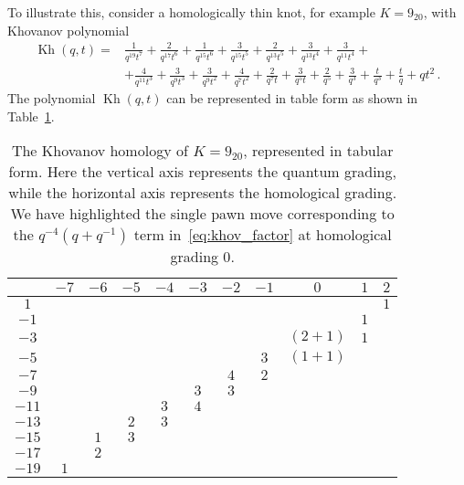 \documentclass[11pt]{article}
\DeclareMathOperator{\Kh}{Kh}
\numberwithin{equation}{section}
\begin{document}
To illustrate this, consider a homologically thin knot, for example $K=9_{20}$,  with Khovanov polynomial
\begin{equation}
\label{eqn:kh920}
\begin{split}
\Kh (q,t)  = & \frac{1}{q^{19} t^7}+\frac{2}{q^{17} t^6}+\frac{1}{q^{15} t^6}+\frac{3}{q^{15}
   t^5}+\frac{2}{q^{13} t^5}+\frac{3}{q^{13} t^4}+\frac{3}{q^{11} t^4}+\\& +\frac{4}{q^{11}
   t^3}+\frac{3}{q^9 t^3}+\frac{3}{q^9 t^2}+\frac{4}{q^7 t^2}+\frac{2}{q^7
   t}+\frac{3}{q^5 t}+\frac{2}{q^5}+\frac{3}{q^3}+\frac{t}{q^3}+\frac{t}{q}+q t^2\,.
\end{split}
\end{equation}
The polynomial $\Kh (q,t)$ can be represented in table form as shown in Table~\ref{table:kh920}.  
\begin{table}
\begin{center}
  \begin{tabular}{|c||c|c|c|c|c|c|c|c|c|c|}
    \hline
     & \!$-7$\! & \!$-6$\! & \!$-5$\! & \!$-4$\! &
      \!$-3$\! & \!$-2$\! & \!$-1$\! & $0$ & $1$ & $2$  \\ \hline\hline
    $1$ & & & & & & & & & & $1$  \\ \hline
    $-1$ & & & & & & & & & $1$ &   \\ \hline
    $-3$ & & & & & & & & \!\!$(2+1)$\!\! & $1$ &  \\ \hline
    $-5$ & & & & & & & $3$ & \!\!$(1+1)$\!\! & &  \\ \hline
    $-7$ & & & & & & $4$ & $2$ & & &  \\ \hline
    $-9$ & & & & & $3$ & $3$ & & & &  \\ \hline
    $-11$ & & & & $3$ & $4$ & & & & &  \\ \hline
    $-13$ & & & $2$ & $3$ & & & & & &  \\ \hline
    $-15$ & & $1$ & $3$ & & & & & & &  \\ \hline
    $-17$ & & $2$ & & & & & & & &  \\ \hline
    $-19$ & $1$ & & & & & & & & &  \\ \hline
  \end{tabular}
\end{center}
\caption{\small{The Khovanov homology of $K=9_{20}$, represented in tabular form.  Here the vertical axis represents the quantum grading, while the horizontal axis represents the homological grading.  We have highlighted the single pawn move corresponding to the $q^{-4}(q+q^{-1})$ term in~\eqref{eq:khov_factor} at homological grading $0$.}}
\label{table:kh920}
\end{table}
\end{document}
